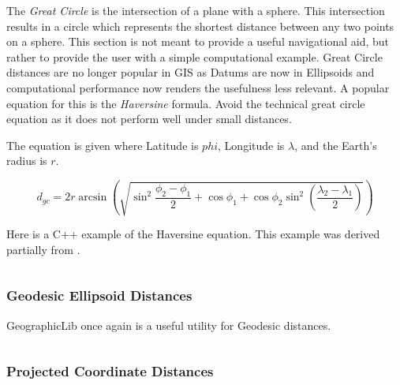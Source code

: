 The \emph{Great Circle} is the intersection of a plane with a sphere.  This intersection
results in a circle which represents the shortest distance between any two points on
a sphere\cite[p. 108]{Meyer_Book}.  This section is not meant to provide a useful navigational aid, but rather to 
provide the user with a simple computational example.  Great Circle distances are no longer popular in GIS
as Datums are now in Ellipsoids and computational performance now renders the usefulness less relevant. A 
popular equation for this is the \emph{Haversine} formula.  Avoid the technical great circle equation as
it does not perform well under small distances.

The equation is given where Latitude is $phi$, Longitude is $\lambda$, and the Earth's radius is $r$.

\begin{equation}
d_{gc} = 2r \arcsin \left( \sqrt{ \sin^2 \frac{\phi_2 - \phi_1}{2} + \cos{\phi_1} + \cos{\phi_2} \sin^2 \left( \frac{\lambda_2 - \lambda_1}{2} \right) }  \right)
\end{equation}

Here is a C++ example of the Haversine equation. This example was derived partially from \cite[p. 109]{Meyer_Book}.
\inputminted{C++}{../code/chapter3/great-circle-distance.cpp}

\subsubsection*{Geodesic Ellipsoid Distances}


GeographicLib once again is a useful utility for Geodesic distances.  

\inputminted{C++}{../code/chapter3/geographiclib-ellipsoid-distance.cpp}




\subsubsection*{Projected Coordinate Distances}


